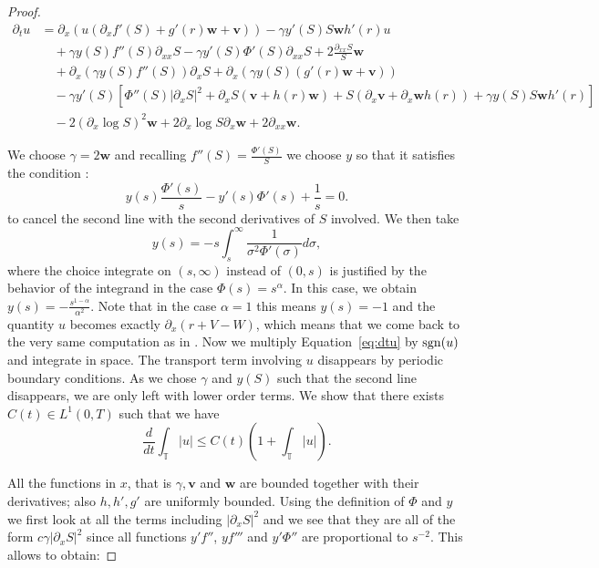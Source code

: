 \documentclass[a4paper,twosided, 11pt]{article}
\newcommand {\sgn} { {\rm sgn} }
\newcommand {\T}  { {\mathbb{T}} }
\newcommand*{\vv}{\mathbf{v}}
\newcommand*{\ww}{\mathbf{w}}
\theoremstyle{plain}
\theoremstyle{remark}
\numberwithin{equation}{section}
\begin{document}
\begin{proof}
\begin{equation}\label{eq:dtu}
\begin{split}
\partial_{t}u 
&= \partial_{x}\left(u\left(\partial_{x}f'(S) + g'(r)\ww + \vv\right)\right) 
   -  \gamma y'(S)S\ww h'(r)u \\
&\quad + \gamma y(S)f''(S)\partial_{xx}S 
   - \gamma y'(S)\Phi'(S)\partial_{xx}S 
   + 2\frac{\partial_{xx}S}{S}\ww \\
&\quad + \partial_{x}\left(\gamma y(S)f''(S)\right)\partial_{x}S 
   + \partial_{x}\left(\gamma y(S)\left(g'(r)\ww+\vv\right)\right) \\
&\quad - \gamma y'(S)\left[\Phi''(S)|\partial_{x}S|^2 
   + \partial_{x}S\left(\vv + h(r)\ww\right) 
   +  S\left(\partial_x\vv + \partial_x\ww h(r)\right)+ \gamma y(S)S\ww h'(r)\right] \\
  &\quad -  2\left(\partial_x\log S\right)^2\ww 
   +  2\partial_{x}\log S\partial_x\ww 
   +  2\partial_{xx}\ww.
\end{split}
\end{equation}


We choose $\gamma =2\ww$ and recalling $f''(S)=\frac{\Phi'(S)}{S}$ we choose $y$ so that it satisfies the condition :
\begin{equation}
y(s)\frac{\Phi'(s)}{s}  - y'(s)\Phi'(s)  + \frac{1}{s}  = 0.
\end{equation}
to cancel the second line with the second derivatives of $S$ involved. 
We then take
$$
y(s)= -s\int_s^{\infty}\frac{1}{\sigma^2\Phi'(\sigma)}d\sigma,
$$
where the choice integrate on $(s,\infty)$ instead of $(0,s)$ is justified by the behavior of the integrand in the case $\Phi(s)=s^{\alpha}$. In this case, we obtain $y(s)=-\frac{s^{1-\alpha}}{\alpha^2}$. Note that in the case $\alpha=1$ this means $y(s)=-1$ and the quantity $u$ becomes exactly $\partial_x(r+V-W)$, which means that we come back to the very same computation as in \cite{2025arXiv250418484M}. Now we multiply Equation~\eqref{eq:dtu} by $\sgn(u)$ and integrate in space. The transport term involving $u$ disappears by periodic boundary conditions. As we chose $\gamma $ and $y(S)$  such that the second line disappears, we are only left with lower order terms. We show that there exists $C(t)\in L^{1}(0,T)$ such that we have
$$
\frac{d}{dt}\int_{\T}|u|\le C(t) \left(1 + \int_{\T}|u|\right).
$$

All the functions in $x$, that is $\gamma,\vv$ and $\ww$ are bounded together with their derivatives; also $h, h', g'$ are uniformly bounded.  Using the definition of $\Phi$ and $y$ we first look at all the terms including $|\partial_xS|^2$ and we see that they are all of the form $c\gamma |\partial_xS|^2$ since all functions $y'f''$, $yf'''$ and $y'\Phi''$ are proportional to $s^{-2}$. This allows to obtain: 



\end{proof}
\end{document}
